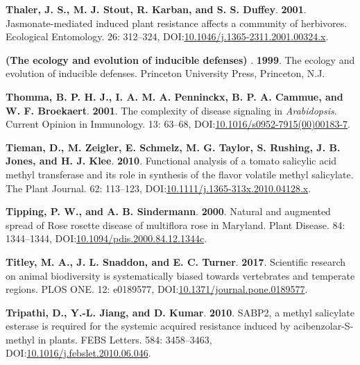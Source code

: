 \documentclass[12pt,final,CPage]{ufthesis}
\newlength{\cslhangindent}
\newenvironment{CSLReferences}[2] %
{%
	\setlength{\parindent}{0pt}
	\ifodd #1 \everypar{\setlength{\hangindent}{\cslhangindent}}\ignorespaces\fi
	\ifnum #2 > 0
	\setlength{\parskip}{#2\baselineskip}
	\fi
}%
{}
\begin{document}
{\begin{CSLReferences}{1}{0}
  \leavevmode{}%
  \textbf{Thaler, J. S., M. J. Stout, R. Karban, and S. S. Duffey}. \textbf{2001}. Jasmonate-mediated induced plant resistance affects a community of herbivores. Ecological Entomology. 26: 312--324, DOI:\href{https://doi.org/10.1046/j.1365-2311.2001.00324.x}{10.1046/j.1365-2311.2001.00324.x}.

  \leavevmode{}%
  \textbf{(The ecology and evolution of inducible defenses) }. \textbf{1999}. The ecology and evolution of inducible defenses. Princeton University Press, Princeton, N.J.

  \leavevmode{}%
  \textbf{Thomma, B. P. H. J., I. A. M. A. Penninckx, B. P. A. Cammue, and W. F. Broekaert}. \textbf{2001}. The complexity of disease signaling in {\emph{Arabidopsis}}. Current Opinion in Immunology. 13: 63--68, DOI:\href{https://doi.org/10.1016/s0952-7915(00)00183-7}{10.1016/s0952-7915(00)00183-7}.

  \leavevmode{}%
  \textbf{Tieman, D., M. Zeigler, E. Schmelz, M. G. Taylor, S. Rushing, J. B. Jones, and H. J. Klee}. \textbf{2010}. Functional analysis of a tomato salicylic acid methyl transferase and its role in synthesis of the flavor volatile methyl salicylate. The Plant Journal. 62: 113--123, DOI:\href{https://doi.org/10.1111/j.1365-313x.2010.04128.x}{10.1111/j.1365-313x.2010.04128.x}.

  \leavevmode{}%
  \textbf{Tipping, P. W., and A. B. Sindermann}. \textbf{2000}. Natural and augmented spread of {Rose rosette disease} of multiflora rose in {Maryland}. Plant Disease. 84: 1344--1344, DOI:\href{https://doi.org/10.1094/pdis.2000.84.12.1344c}{10.1094/pdis.2000.84.12.1344c}.

  \leavevmode{}%
  \textbf{Titley, M. A., J. L. Snaddon, and E. C. Turner}. \textbf{2017}. Scientific research on animal biodiversity is systematically biased towards vertebrates and temperate regions. {PLOS} {ONE}. 12: e0189577, DOI:\href{https://doi.org/10.1371/journal.pone.0189577}{10.1371/journal.pone.0189577}.

  \leavevmode{}%
  \textbf{Tripathi, D., Y.-L. Jiang, and D. Kumar}. \textbf{2010}. {SABP}2, a methyl salicylate esterase is required for the systemic acquired resistance induced by acibenzolar-{S}-methyl in plants. {FEBS} Letters. 584: 3458--3463, DOI:\href{https://doi.org/10.1016/j.febslet.2010.06.046}{10.1016/j.febslet.2010.06.046}.


\end{CSLReferences}}
\end{document}
